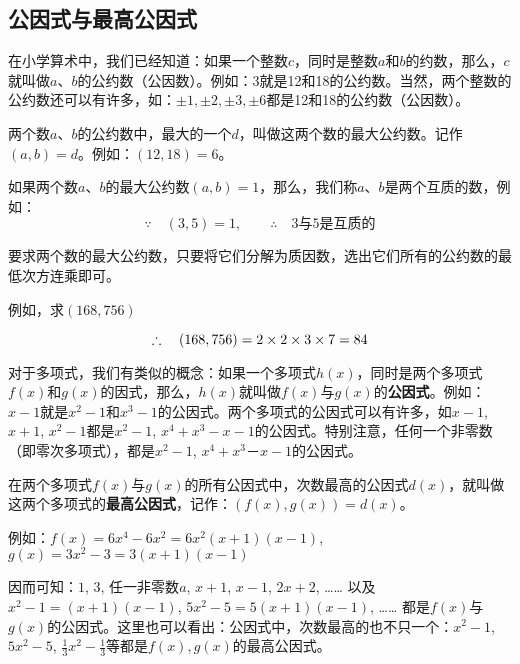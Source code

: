 \subsection{公因式与最高公因式}
在小学算术中，我们已经知道：如果一个整数$c$，同时是整数$a$和$b$的约数，那么，$c$就叫做$a$、$b$的公约数（公因数）。例如：3就是12和18的公约数。当然，两个整数的公约数还可以有许多，如：$\pm 1,\pm 2,\pm 3,\pm 6$都是12和18的公约数（公因数）。

两个数$a$、$b$的公约数中，最大的一个$d$，叫做这两个数的最大公约数。记作$(a,b)=d$。例如：$(12, 18)=6$。

如果两个数$a$、$b$的最大公约数$(a,b)=1$，那么，我们称$a$、$b$是两个互质的数，例如：
\[\because\quad (3,5)=1,\qquad \therefore\quad \text{3与5是互质的}\]

要求两个数的最大公约数，只要将它们分解为质因数，选出它们所有的公约数的最低次方连乘即可。

例如，求$(168,756)$
\begin{center}
\end{center}
\[\therefore \quad (168, 756)=2\times 2\times 3\times 7=84\]

对于多项式，我们有类似的概念：如果一个多项式$h(x)$，同时是两个多项式$f(x)$和$g(x)$的因式，那么，$h(x)$就叫做$f(x)$与$g(x)$的\textbf{公因式}。例如：$x-1$就是$x^2-1$和$x^3-1$的公因式。两个多项式的公因式可以有许多，如$x-1$, $x+1$, $x^2-1$都是$x^2-1$, $x^4+x^3-x-1$的公因式。特别注意，任何一个非零数（即零次多项式），都是$x^2-1$, $x^4+x^3－x-1$的公因式。

在两个多项式$f(x)$与$g(x)$的所有公因式中，次数最高的公因式$d(x)$，就叫做这两个多项式的\textbf{最高公因式}，记作：$(f(x),g(x))=d(x)$。

例如：$f(x)=6x^4-6x^2=6x^2(x+1)(x-1)$, 
$g (x) =3x^2-3=3 (x+1) (x-1)$

因而可知：$1$, $3$, 任一非零数$a$, $x+1$, $x-1$, $2x+2$, …… 以及$x^2-1=(x+1)(x-1)$, $5x^2-5=5(x+1)(x-1)$, …… 都是$f(x)$与$g(x)$的公因式。这里也可以看出：公因式中，次数最高的也不只一个：$x^2-1$,$5x^2-5$, $\frac{1}{3}x^2-\frac{1}{3}$等都是$f(x),g(x)$的最高公因式。

